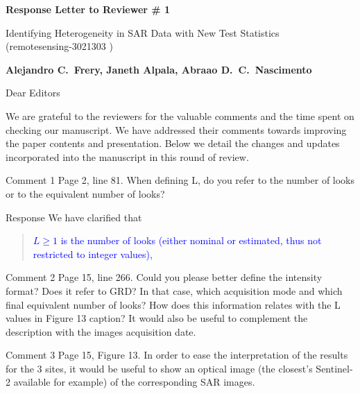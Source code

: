 \documentclass[11pt]{report}
\begin{document}
\begin{center}
\large{\textbf{Response Letter to Reviewer \# 1}}

\vglue 0.3cm

\huge{ Identifying Heterogeneity in SAR Data with New Test Statistics\\ (remotesensing-3021303 )}
\end{center}

\begin{center}
\textbf{Alejandro C.\ Frery, Janeth Alpala, Abraao D.\ C.\ Nascimento }
\end{center}

\date{\today}



\vspace{2cm}
\noindent Dear Editors
\bigskip

\noindent We are grateful to the reviewers for the valuable comments and the time spent on checking our manuscript. 
We have addressed their comments towards improving the paper contents and presentation. 
Below we detail the changes and updates incorporated into the manuscript in this round of review.

\medskip


\begin{reviewbox}{Comment 1}
Page 2, line 81. When defining L, do you refer to the number of looks or to the equivalent number of looks?

\end{reviewbox}

\begin{responsebox}{Response}
We have clarified that
\begin{quote}
	\textcolor{blue}{\(L \geq 1\) is the number of looks (either nominal or estimated, thus not restricted to integer values),}
\end{quote}
\end{responsebox}

\begin{reviewbox}{Comment 2}
Page 15, line 266. Could you please better define the intensity format? Does it refer to GRD? In that case, which acquisition mode and which final equivalent number of looks? How does this information relates with the L values in Figure 13 caption? It would also be useful to complement the description with the images acquisition date.
\end{reviewbox}

\begin{reviewbox}{Comment 3}
Page 15, Figure 13. In order to ease the interpretation of the results for the 3 sites, it would be useful to show an optical image (the closest's Sentinel-2 available for example) of the corresponding SAR images.
\end{reviewbox}
\end{document}
